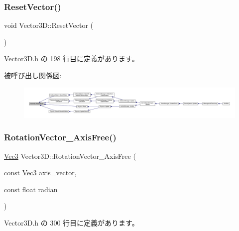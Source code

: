 \subsubsection{\texorpdfstring{Reset\+Vector()}{ResetVector()}}
{\footnotesize\ttfamily void Vector3\+D\+::\+Reset\+Vector (\begin{DoxyParamCaption}{ }\end{DoxyParamCaption})\hspace{0.3cm}{\ttfamily [inline]}}



 Vector3\+D.\+h の 198 行目に定義があります。

被呼び出し関係図\+:
\nopagebreak
\begin{figure}[H]
\begin{center}
\leavevmode
\includegraphics[width=350pt]{class_vector3_d_a9cfe261f14b3b2e6704c5649058d3ecd_icgraph}
\end{center}
\end{figure}
\mbox{\label{class_vector3_d_aadbe9f3e0ee3298c59cf123b592140bd}} 
\subsubsection{\texorpdfstring{Rotation\+Vector\+\_\+\+Axis\+Free()}{RotationVector\_AxisFree()}}
{\footnotesize\ttfamily \mbox{\hyperlink{_vector3_d_8h_ab16f59e4393f29a01ec8b9bbbabbe65d}{Vec3}} Vector3\+D\+::\+Rotation\+Vector\+\_\+\+Axis\+Free (\begin{DoxyParamCaption}\item[{const \mbox{\hyperlink{_vector3_d_8h_ab16f59e4393f29a01ec8b9bbbabbe65d}{Vec3}}}]{axis\+\_\+vector,  }\item[{const float}]{radian }\end{DoxyParamCaption})\hspace{0.3cm}{\ttfamily [inline]}}



 Vector3\+D.\+h の 300 行目に定義があります。

